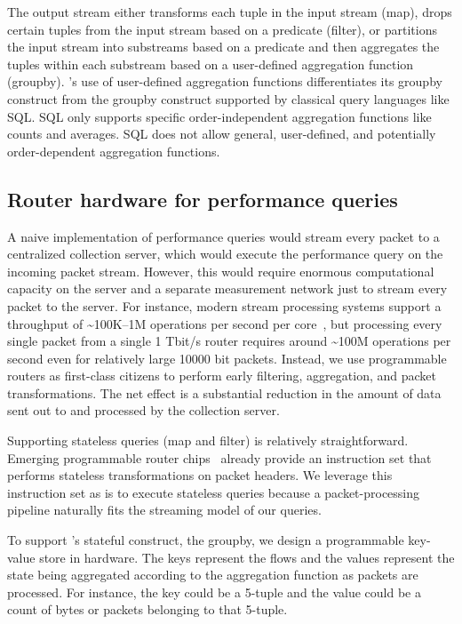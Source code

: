 The output stream either transforms each tuple in the input stream ({\ct map}),
drops certain tuples from the input stream based on a predicate ({\ct filter}),
or partitions the input stream into substreams based on a predicate and then
aggregates the tuples within each substream based on a user-defined aggregation
function ({\ct groupby}). \TheSystem's use of user-defined aggregation
functions differentiates its groupby construct from the groupby construct
supported by classical query languages like SQL. SQL only supports specific
order-independent aggregation functions like counts and averages. SQL does not
allow general, user-defined, and potentially order-dependent aggregation
functions. 

\subsection{Router hardware for performance queries}
\label{ss:intro_pq_hardware}

A naive implementation of performance queries would stream every packet to a
centralized collection server, which would execute the performance query on the
incoming packet stream. However, this would require enormous computational
capacity on the server and a separate measurement network just to stream every
packet to the server. For instance, modern stream processing systems support a
throughput of \textasciitilde100K--1M operations per second per
core~\cite{kafka_benchmark, redis_benchmark, memcached_benchmark,
redis_vs_memcached_update, spark-streaming}, but processing every single packet
from a single 1 Tbit/s router requires around \textasciitilde100M operations
per second even for relatively large 10000 bit packets. Instead, we use programmable
routers as first-class citizens to perform early filtering, aggregation, and
packet transformations. The net effect is a substantial reduction in the amount
of data sent out to and processed by the collection server.

Supporting stateless queries ({\ct map} and {\ct filter}) is relatively
straightforward. Emerging programmable router chips~\cite{rmt, xpliant,
flexpipe, tofino} already provide an instruction set that performs stateless
transformations on packet headers. We leverage this instruction set as is to
execute stateless queries because a packet-processing pipeline naturally fits
the streaming model of our queries.

To support \TheSystem's stateful construct, the {\ct groupby}, we design a
programmable key-value store in hardware. The keys represent the flows and the
values represent the state being aggregated according to the aggregation
function as packets are processed. For instance, the key could be a 5-tuple and
the value could be a count of bytes or packets belonging to that 5-tuple.

